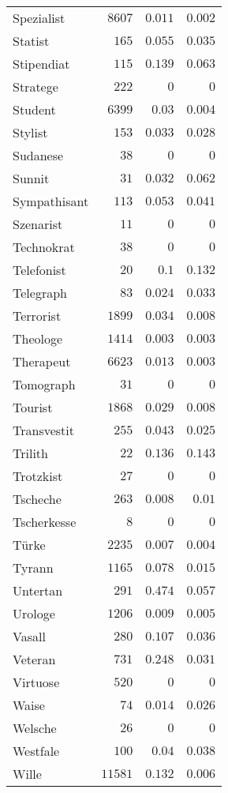 \begin{supertabular}{lrrr}
Spezialist & $8607$ & $0.011$ & $0.002$ \\
Statist & $165$ & $0.055$ & $0.035$ \\
Stipendiat & $115$ & $0.139$ & $0.063$ \\
Stratege & $222$ & $0$ & $0$ \\
Student & $6399$ & $0.03$ & $0.004$ \\
Stylist & $153$ & $0.033$ & $0.028$ \\
Sudanese & $38$ & $0$ & $0$ \\
Sunnit & $31$ & $0.032$ & $0.062$ \\
Sympathisant & $113$ & $0.053$ & $0.041$ \\
Szenarist & $11$ & $0$ & $0$ \\
Technokrat & $38$ & $0$ & $0$ \\
Telefonist & $20$ & $0.1$ & $0.132$ \\
Telegraph & $83$ & $0.024$ & $0.033$ \\
Terrorist & $1899$ & $0.034$ & $0.008$ \\
Theologe & $1414$ & $0.003$ & $0.003$ \\
Therapeut & $6623$ & $0.013$ & $0.003$ \\
Tomograph & $31$ & $0$ & $0$ \\
Tourist & $1868$ & $0.029$ & $0.008$ \\
Transvestit & $255$ & $0.043$ & $0.025$ \\
Trilith & $22$ & $0.136$ & $0.143$ \\
Trotzkist & $27$ & $0$ & $0$ \\
Tscheche & $263$ & $0.008$ & $0.01$ \\
Tscherkesse & $8$ & $0$ & $0$ \\
Türke & $2235$ & $0.007$ & $0.004$ \\
Tyrann & $1165$ & $0.078$ & $0.015$ \\
Untertan & $291$ & $0.474$ & $0.057$ \\
Urologe & $1206$ & $0.009$ & $0.005$ \\
Vasall & $280$ & $0.107$ & $0.036$ \\
Veteran & $731$ & $0.248$ & $0.031$ \\
Virtuose & $520$ & $0$ & $0$ \\
Waise & $74$ & $0.014$ & $0.026$ \\
Welsche & $26$ & $0$ & $0$ \\
Westfale & $100$ & $0.04$ & $0.038$ \\
Wille & $11581$ & $0.132$ & $0.006$ \\

\end{supertabular}
